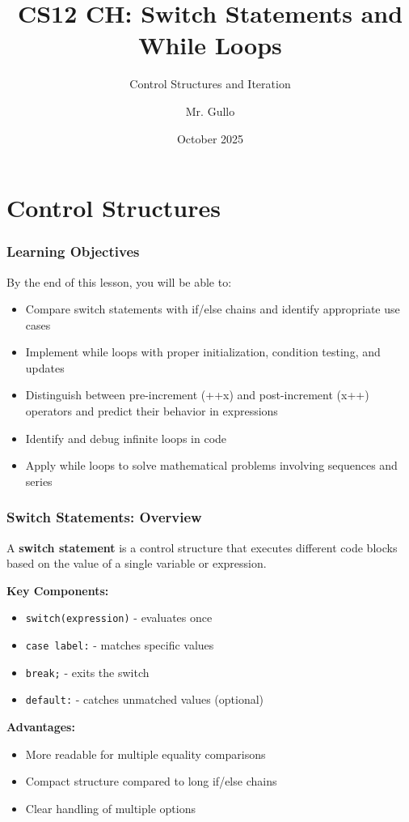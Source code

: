 \documentclass{beamer}
\title[Switch and While Loops]{CS12 CH: Switch Statements and While Loops}
\subtitle{Control Structures and Iteration}
\author[Mr. Gullo]{Mr. Gullo}
\date[Oct 2025]{October 2025}
\begin{document}
\frame{\titlepage}

\section{Control Structures}

\begin{frame}
\frametitle{Learning Objectives}
By the end of this lesson, you will be able to:
\begin{itemize}
\item Compare switch statements with if/else chains and identify appropriate use cases
\pause
\item Implement while loops with proper initialization, condition testing, and updates
\pause
\item Distinguish between pre-increment (++x) and post-increment (x++) operators and predict their behavior in expressions
\pause
\item Identify and debug infinite loops in code
\pause
\item Apply while loops to solve mathematical problems involving sequences and series
\end{itemize}
\end{frame}

\begin{frame}
\frametitle{Switch Statements: Overview}
A \textbf{switch statement} is a control structure that executes different code blocks based on the value of a single variable or expression.

\textbf{Key Components:}
\begin{itemize}
\item \texttt{switch(expression)} - evaluates once
\pause
\item \texttt{case label:} - matches specific values
\pause
\item \texttt{break;} - exits the switch
\pause
\item \texttt{default:} - catches unmatched values (optional)
\end{itemize}

\textbf{Advantages:}
\begin{itemize}
\item More readable for multiple equality comparisons
\pause
\item Compact structure compared to long if/else chains
\pause
\item Clear handling of multiple options
\end{itemize}
\end{frame}
\end{document}
